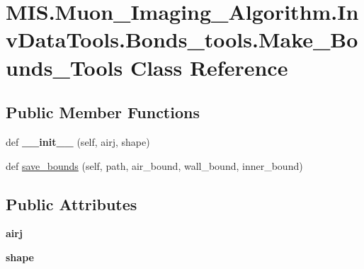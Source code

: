\hypertarget{classMIS_1_1Muon__Imaging__Algorithm_1_1InvDataTools_1_1Bonds__tools_1_1Make__Bounds__Tools}{}\section{M\+I\+S.\+Muon\+\_\+\+Imaging\+\_\+\+Algorithm.\+Inv\+Data\+Tools.\+Bonds\+\_\+tools.\+Make\+\_\+\+Bounds\+\_\+\+Tools Class Reference}
\label{classMIS_1_1Muon__Imaging__Algorithm_1_1InvDataTools_1_1Bonds__tools_1_1Make__Bounds__Tools}
\subsection*{Public Member Functions}
\begin{DoxyCompactItemize}
\item 
\mbox{\label{classMIS_1_1Muon__Imaging__Algorithm_1_1InvDataTools_1_1Bonds__tools_1_1Make__Bounds__Tools_a9ee6ec98c6bc48d4c69cabdb00d7f9fe}} 
def {\bfseries \+\_\+\+\_\+init\+\_\+\+\_\+} (self, airj, shape)
\item 
def \hyperlink{classMIS_1_1Muon__Imaging__Algorithm_1_1InvDataTools_1_1Bonds__tools_1_1Make__Bounds__Tools_a89e5090986235149c04dbeeb25756ad2}{save\+\_\+bounds} (self, path, air\+\_\+bound, wall\+\_\+bound, inner\+\_\+bound)
\end{DoxyCompactItemize}
\subsection*{Public Attributes}
\begin{DoxyCompactItemize}
\item 
\mbox{\label{classMIS_1_1Muon__Imaging__Algorithm_1_1InvDataTools_1_1Bonds__tools_1_1Make__Bounds__Tools_ae68e1cc5f72e5af3e48ab404544bdd7d}} 
{\bfseries airj}
\item 
\mbox{\label{classMIS_1_1Muon__Imaging__Algorithm_1_1InvDataTools_1_1Bonds__tools_1_1Make__Bounds__Tools_a882308fffa1f659798a8f951b053bd46}} 
{\bfseries shape}
\end{DoxyCompactItemize}


